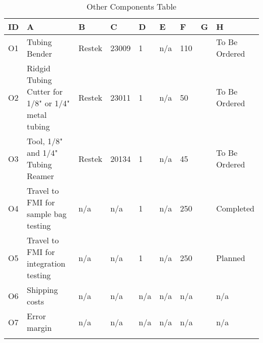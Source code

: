 \begin{longtable} {|m{}|m{}|m{}|m{}|m{}|m{}|m{}|m{}|m{}|} \hline \textbf{ID} & \textbf{A} & \textbf{B} & \textbf{C} & \textbf{D} & \textbf{E} & \textbf{F}  & \textbf{G}  & \textbf{H} \\ \hline O1 & Tubing Bender & Restek & 23009 & 1 & n/a & 110 &  & To Be Ordered \\ \hline O2 & Ridgid Tubing Cutter for 1/8" or 1/4" metal tubing & Restek & 23011 & 1 & n/a & 50 &  & To Be Ordered \\ \hline O3 & Tool, 1/8" and 1/4" Tubing Reamer & Restek & 20134 & 1 & n/a & 45 &  & To Be Ordered \\ \hline O4 & Travel to FMI for sample bag testing & n/a & n/a & 1 & n/a & 250 &  & Completed \\ \hline O5 & Travel to FMI for integration testing & n/a & n/a & 1 & n/a & 250 &  & Planned \\ \hline O6 & Shipping costs & n/a & n/a & n/a & n/a & n/a &  & n/a \\ \hline O7 & Error margin & n/a & n/a & n/a & n/a & n/a &  & n/a \\ \hline \caption{Other Components Table} \label{tab:component-table-other} \end{longtable} \raggedbottom